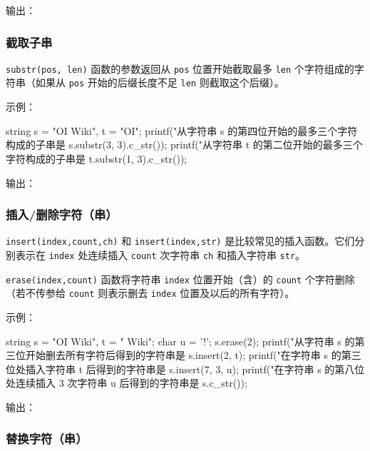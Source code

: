 输出：



\subsubsection{截取子串}\label{ux622aux53d6ux5b50ux4e32}

\texttt{substr(pos,\ len)} 函数的参数返回从 \texttt{pos} 位置开始截取最多 \texttt{len} 个字符组成的字符串（如果从 \texttt{pos} 开始的后缀长度不足 \texttt{len} 则截取这个后缀）。

示例：


\begin{codeline}
string s = "OI Wiki", t = "OI";
printf("从字符串 s 的第四位开始的最多三个字符构成的子串是 %
       s.substr(3, 3).c_str());
printf("从字符串 t 的第二位开始的最多三个字符构成的子串是 %
       t.substr(1, 3).c_str());
\end{codeline}


输出：



\subsubsection{插入/删除字符（串）}\label{ux63d2ux5165ux5220ux9664ux5b57ux7b26ux4e32}

\texttt{insert(index,count,ch)} 和 \texttt{insert(index,str)} 是比较常见的插入函数。它们分别表示在 \texttt{index} 处连续插入 \texttt{count} 次字符串 \texttt{ch} 和插入字符串 \texttt{str}。

\texttt{erase(index,count)} 函数将字符串 \texttt{index} 位置开始（含）的 \texttt{count} 个字符删除（若不传参给 \texttt{count} 则表示删去 \texttt{index} 位置及以后的所有字符）。

示例：


\begin{codeline}
string s = "OI Wiki", t = " Wiki";
char u = '!';
s.erase(2);
printf("从字符串 s 的第三位开始删去所有字符后得到的字符串是 %
s.insert(2, t);
printf("在字符串 s 的第三位处插入字符串 t 后得到的字符串是 %
s.insert(7, 3, u);
printf("在字符串 s 的第八位处连续插入 3 次字符串 u 后得到的字符串是 %
       s.c_str());
\end{codeline}


输出：



\subsubsection{替换字符（串）}\label{ux66ffux6362ux5b57ux7b26ux4e32}

